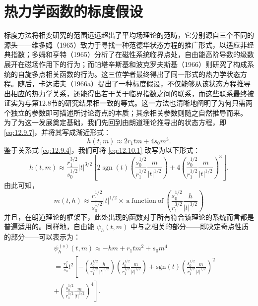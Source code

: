 \section{热力学函数的标度假设}\label{ux70edux529bux5b66ux51fdux6570ux7684ux6807ux5ea6ux5047ux8bbe}
标度方法将相变研究的范围远远超出了平均场理论的范畴，它分别源自三个不同的源头——维多姆（1965）致力于寻找一种范德华状态方程的推广形式，以适应非经典指数；多姆和亨特（1965）分析了在磁性系统临界点处，自由能高阶导数的级数展开在磁场作用下的行为；而帕塔辛斯基和波克罗夫斯基（1966）则研究了构成系统的自旋多点相关函数的行为。这三位学者最终得出了同一形式的热力学状态方程。随后，卡达诺夫（1966a）提出了一种标度假设，不仅能够从该状态方程推导出相应的热力学关系，还能得出若干关于临界指数之间的联系，而这些联系最终被证实为与第12.8节的研究结果相一致的等式。这一方法也清晰地阐明了为何只需两个独立的参数即可描述所讨论奇点的本质；其余相关参数则随之自然推导而来。
为了为这一发展奠定基础，我们先回到由朗道理论推导出的状态方程，即 \autoref{eq:12.9.7}，并将其写成渐近形式：
\begin{equation}\tag{12.10.1}\label{eq:12.10.1}
h ( t , m ) \approx 2 r _ { 1 } t m + 4 s _ { 0 } m ^{3} .
\end{equation}
鉴于关系式 \autoref{eq:12.9.4}，我们可将 \autoref{eq:12.10.1} 改写为以下形式：
\begin{equation}\tag{12.10.2}\label{eq:12.10.2}
h ( t , m ) \approx \frac { r _ { 1 } ^{3 / 2} } { s _ { 0 } ^{1 / 2} } | t | ^{3 / 2} \left[ 2 \operatorname { s g n } ( t ) \left( \frac { s _ { 0 } ^{1 / 2} } { r _ { 1 } ^{1 / 2} } \frac { m } { | t | ^{1 / 2} } \right) + 4 \left( \frac { s _ { 0 } ^{1 / 2} } { r _ { 1 } ^{1 / 2} } \frac { m } { | t | ^{1 / 2} } \right) ^{3} \right] .
\end{equation}
由此可知，
\begin{equation}\tag{12.10.3}\label{eq:12.10.3}
m ( t , h ) \approx \frac { r _ { 1 } ^{1 / 2} } { s _ { 0 } ^{1 / 2} } | t | ^{1 / 2} \times \mathrm { ~ a ~ f u n c t i o n ~ o f ~ } \left( \frac { s _ { 0 } ^{1 / 2} } { r _ { 1 } ^{3 / 2} } \frac { h } { | t | ^{3 / 2} } \right)
\end{equation}
并且，在朗道理论的框架下，此处出现的函数对于所有符合该理论的系统而言都是普遍适用的。同样地，自由能 \(\psi_{h}(t,m)\) 中与之相关的部分——即决定奇点性质的部分——可以表示为：
\begin{equation}\tag{12.10.4}\label{eq:12.10.4}
\begin{array}{rlr} & { } & { \psi _ { h } ^{( s )} ( t , m ) \approx - h m + r _ { 1 } t m ^{2} + s _ { 0 } m ^{4} } \\& { } & { = \frac { r _ { 1 } ^{2} } { s _ { 0 } } t ^{2} \left[ - \left( \frac { s _ { 0 } ^{1 / 2} } { r _ { 1 } ^{3 / 2} } \frac { h } { | t | ^{3 / 2} } \right) \left( \frac { s _ { 0 } ^{1 / 2} } { r _ { 1 } ^{1 / 2} } \frac { m } { | t | ^{1 / 2} } \right) + \mathrm { s g n } ( t ) \left( \frac { s _ { 0 } ^{1 / 2} } { r _ { 1 } ^{1 / 2} } \frac { m } { | t | ^{1 / 2} } \right) ^{2} \right. } \\& { } & { \left. + \left( \frac { s _ { 0 } ^{1 / 2} } { r _ { 1 } ^{1 / 2} } \frac { m } { | t | ^{1 / 2} } \right) ^{4} \right] . } \end{array}
\end{equation}

